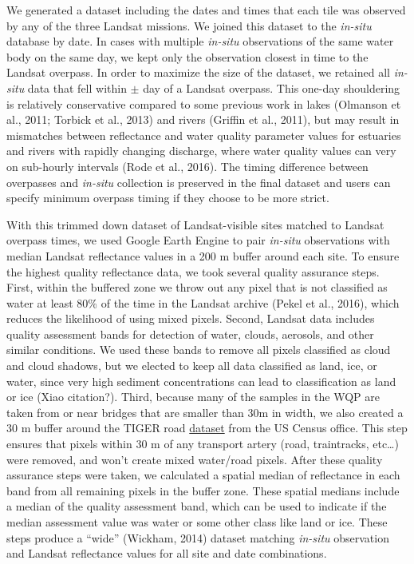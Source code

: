 \documentclass[]{article}
\begin{document}
We generated a dataset including the dates and times that each tile was
observed by any of the three Landsat missions. We joined this dataset to
the \emph{in-situ} database by date. In cases with multiple
\emph{in-situ} observations of the same water body on the same day, we
kept only the observation closest in time to the Landsat overpass. In
order to maximize the size of the dataset, we retained all
\emph{in-situ} data that fell within \(\pm\) day of a Landsat overpass.
This one-day shouldering is relatively conservative compared to some
previous work in lakes (Olmanson et al., 2011; Torbick et al., 2013) and
rivers (Griffin et al., 2011), but may result in mismatches between
reflectance and water quality parameter values for estuaries and rivers
with rapidly changing discharge, where water quality values can very on
sub-hourly intervals (Rode et al., 2016). The timing difference between
overpasses and \emph{in-situ} collection is preserved in the final
dataset and users can specify minimum overpass timing if they choose to
be more strict.

With this trimmed down dataset of Landsat-visible sites matched to
Landsat overpass times, we used Google Earth Engine to pair
\emph{in-situ} observations with median Landsat reflectance values in a
200 m buffer around each site. To ensure the highest quality reflectance
data, we took several quality assurance steps. First, within the
buffered zone we throw out any pixel that is not classified as water at
least 80\% of the time in the Landsat archive (Pekel et al., 2016),
which reduces the likelihood of using mixed pixels. Second, Landsat data
includes quality assessment bands for detection of water, clouds,
aerosols, and other similar conditions. We used these bands to remove
all pixels classified as cloud and cloud shadows, but we elected to keep
all data classified as land, ice, or water, since very high sediment
concentrations can lead to classification as land or ice (Xiao
citation?). Third, because many of the samples in the WQP are taken from
or near bridges that are smaller than 30m in width, we also created a 30
m buffer around the TIGER road
\href{https://www.census.gov/geo/maps-data/data/tiger.html}{dataset}
from the US Census office. This step ensures that pixels within 30 m of
any transport artery (road, traintracks, etc\ldots{}) were removed, and
won't create mixed water/road pixels. After these quality assurance
steps were taken, we calculated a spatial median of reflectance in each
band from all remaining pixels in the buffer zone. These spatial medians
include a median of the quality assessment band, which can be used to
indicate if the median assessment value was water or some other class
like land or ice. These steps produce a ``wide'' (Wickham, 2014) dataset
matching \emph{in-situ} observation and Landsat reflectance values for
all site and date combinations.
\end{document}
